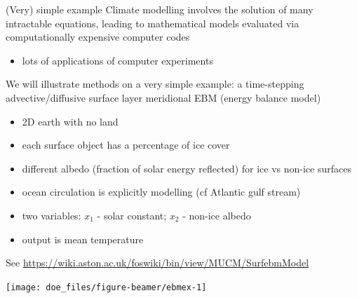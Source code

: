 \documentclass[
  ignorenonframetext,
]{beamer}
\newenvironment{Shaded}{\begin{snugshade}}{\end{snugshade}}
\newcommand{\AttributeTok}[1]{\textcolor[rgb]{0.77,0.63,0.00}{#1}}
\newcommand{\DecValTok}[1]{\textcolor[rgb]{0.00,0.00,0.81}{#1}}
\newcommand{\DocumentationTok}[1]{\textcolor[rgb]{0.56,0.35,0.01}{\textbf{\textit{#1}}}}
\newcommand{\FunctionTok}[1]{\textcolor[rgb]{0.00,0.00,0.00}{#1}}
\newcommand{\NormalTok}[1]{#1}
\newcommand{\OtherTok}[1]{\textcolor[rgb]{0.56,0.35,0.01}{#1}}
\newcommand{\SpecialCharTok}[1]{\textcolor[rgb]{0.00,0.00,0.00}{#1}}
\providecommand{\tightlist}{%
  \setlength{\itemsep}{0pt}\setlength{\parskip}{0pt}}
\begin{document}
\begin{frame}{(Very) simple example}
\protect\hypertarget{very-simple-example}{}
Climate modelling involves the solution of many intractable equations,
leading to mathematical models evaluated via computationally expensive
computer codes

\begin{itemize}
\tightlist
\item
  lots of applications of computer experiments
\end{itemize}

We will illustrate methods on a very simple example: a time-stepping
advective/diffusive surface layer meridional EBM (energy balance model)

\begin{itemize}
\tightlist
\item
  2D earth with no land
\item
  each surface object has a percentage of ice cover
\item
  different albedo (fraction of solar energy reflected) for ice vs
  non-ice surfaces
\item
  ocean circulation is explicitly modelling (cf Atlantic gulf stream)
\item
  two variables: \(x_1\) - solar constant; \(x_2\) - non-ice albedo
\item
  output is mean temperature
\end{itemize}

See \url{https://wiki.aston.ac.uk/foswiki/bin/view/MUCM/SurfebmModel}
\end{frame}

\begin{frame}[fragile]{}
\protect\hypertarget{section-37}{}
\begin{Shaded}
\end{Shaded}

\begin{center}\texttt{[image: doe\_files/figure-beamer/ebmex-1]} \end{center}
\end{frame}
\end{document}
